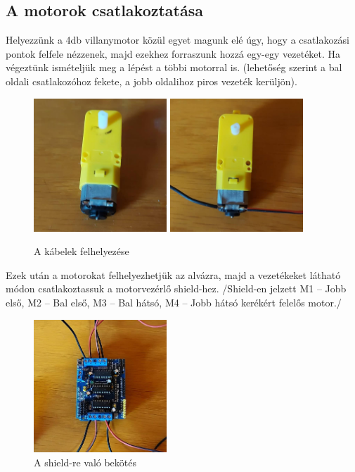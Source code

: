 \documentclass[]{thesis-ekf}
\theoremstyle{definition}
\begin{document}
\subsection{A motorok csatlakoztatása}
Helyezzünk a 4db villanymotor közül egyet magunk elé úgy, hogy a csatlakozási pontok felfele nézzenek, majd ezekhez forraszunk hozzá egy-egy vezetéket. Ha végeztünk ismételjük meg a lépést a többi motorral is. (lehetőség szerint a bal oldali csatlakozóhoz fekete, a jobb oldalihoz piros vezeték kerüljön).
\begin{figure}[h]
	\centering
	\includegraphics[width=5cm]{images/robot_build/motor-no-cable}
	\includegraphics[width=5cm]{images/robot_build/motor-with-cable}
	\caption{A kábelek felhelyezése}
	\label{motor-handling}
\end{figure}

Ezek után a motorokat felhelyezhetjük az alvázra, majd a vezetékeket  látható módon csatlakoztassuk a motorvezérlő shield-hez.
/Shield-en jelzett M1 – Jobb első, M2 – Bal első, M3 – Bal hátsó, M4 – Jobb hátsó kerékért felelős motor./
\begin{figure}[h]
	\centering
	\includegraphics[width=5cm]{images/robot_build/shieldre-bekotes}
	\caption{A shield-re való bekötés}
	\label{shieldre-bekotes}
\end{figure}
\end{document}
